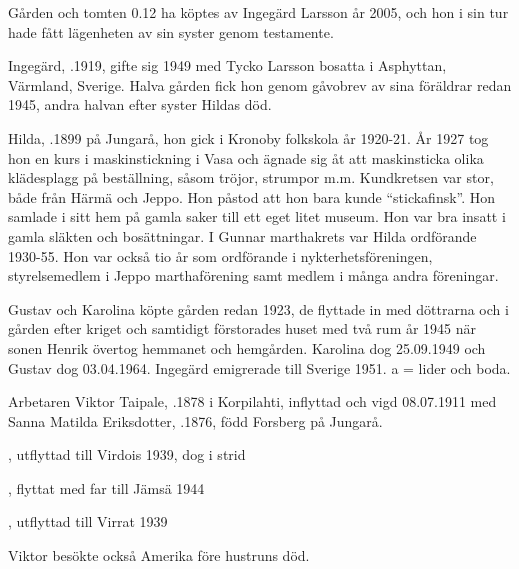 
Gården och tomten 0.12 ha köptes av Ingegärd Larsson år 2005, och hon i sin tur hade fått lägenheten av sin syster genom testamente.\jhvspace{}


Ingegärd, .1919, gifte sig 1949 med Tycko Larsson bosatta i Asphyttan, Värmland, Sverige. Halva gården fick hon genom gåvobrev av sina föräldrar redan 1945, andra halvan efter syster Hildas död.\jhvspace{}



Hilda, .1899 på Jungarå, hon gick i Kronoby folkskola år 1920-21. År 1927 tog hon en kurs i maskinstickning i Vasa och ägnade sig åt att maskinsticka olika klädesplagg på beställning, såsom tröjor, strumpor m.m. Kundkretsen var stor, både från Härmä och Jeppo. Hon påstod att hon bara kunde ``stickafinsk''. Hon samlade i sitt hem på gamla saker till ett eget litet museum. Hon var bra insatt i gamla släkten och bosättningar. I Gunnar marthakrets var Hilda ordförande 1930-55. Hon var också tio år som ordförande i nykterhetsföreningen, styrelsemedlem i Jeppo marthaförening samt medlem i många andra föreningar.


Gustav och Karolina köpte gården redan 1923, de flyttade in med döttrarna  och  i gården efter kriget och samtidigt förstorades huset med två rum år 1945 när sonen Henrik övertog hemmanet och hemgården. Karolina dog 25.09.1949 och Gustav dog 03.04.1964. Ingegärd emigrerade till Sverige 1951.  a = lider och 	boda.


Arbetaren Viktor Taipale, .1878 i Korpilahti, inflyttad och vigd 08.07.1911 med Sanna Matilda Eriksdotter, .1876, född Forsberg på Jungarå.
\begin{jhchildren}
  \item {}, utflyttad till Virdois 1939, dog i strid
  \item {}
  \item {}, flyttat med far till Jämsä 1944
  \item {}
  \item {}, utflyttad till Virrat 1939
\end{jhchildren}
Viktor besökte också Amerika före hustruns död.

